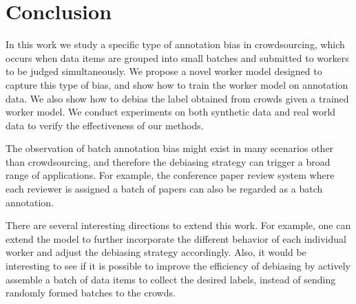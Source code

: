 \section{Conclusion}
\label{sec:conclusion}

In this work we study a specific type of annotation bias in crowdsourcing, 
which occurs when data items are grouped into small batches 
and submitted to workers to be judged simultaneously.  
We propose a novel worker model designed to capture this type of bias, 
and show how to train the worker model on annotation data.  
We also show how to debias the label obtained from crowds given a trained worker model.  
We conduct experiments on both synthetic data and real world data to verify the effectiveness of our methods.  

The observation of batch annotation bias might exist in many scenarios other than crowdsourcing, 
and therefore the debiasing strategy can trigger a broad range of applications. 
For example, the conference paper review system where each reviewer is assigned a batch of papers 
can also be regarded as a batch annotation.  

There are several interesting directions to extend this work.  
For example, one can extend the model to further incorporate the different behavior of each individual worker  
and adjust the debiasing strategy accordingly.  
Also, it would be interesting to see if it is possible to improve the efficiency of debiasing 
by actively assemble a batch of data items to collect the desired labels, 
instead of sending randomly formed batches to the crowds.  


